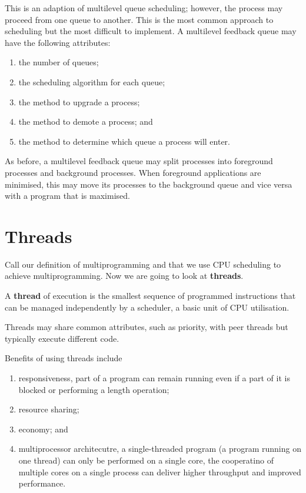 \begin{definition}
    This is an adaption of multilevel queue scheduling; however, the process may proceed from one queue to another. This is the most common approach to scheduling but the most difficult to implement. A multilevel feedback queue may have the following attributes:
    \begin{enumerate}
        \item the number of queues;
        \item the scheduling algorithm for each queue;
        \item the method to upgrade a process;
        \item the method to demote a process; and
        \item the method to determine which queue a process will enter.
    \end{enumerate}
\end{definition}

\begin{example}
    As before, a multilevel feedback queue may split processes into foreground processes and background processes. When foreground applications are minimised, this may move its processes to the background queue and vice versa with a program that is maximised.
\end{example}

\section{Threads}

Call our definition of multiprogramming and that we use CPU scheduling to achieve multiprogramming. Now we are going to look at \textbf{threads}.

\begin{definition}[Thread]
    A \textbf{thread} of execution is the smallest sequence of programmed instructions that can be managed independently by a scheduler, a basic unit of CPU utilisation.
\end{definition}

Threads may share common attributes, such as priority, with peer threads but typically execute different code.

Benefits of using threads include
\begin{enumerate}
    \item responsiveness, part of a program can remain running even if a part of it is blocked or performing a length operation;
    \item resource sharing;
    \item economy; and %
    \item multiprocessor architecutre, a single-threaded program (a program running on one thread) can only be performed on a single core, the cooperatino of multiple cores on a single process can deliver higher throughput and improved performance.
\end{enumerate}

